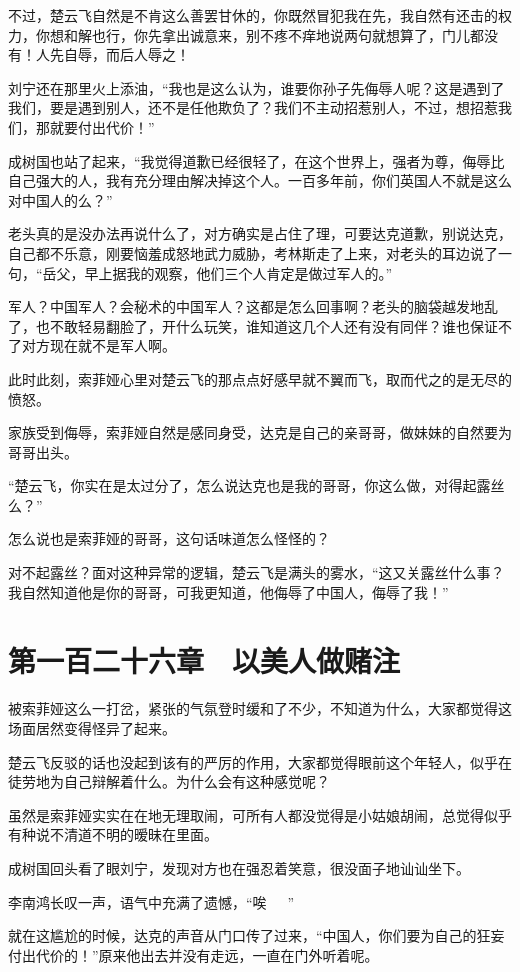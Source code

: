 不过，楚云飞自然是不肯这么善罢甘休的，你既然冒犯我在先，我自然有还击的权力，你想和解也行，你先拿出诚意来，别不疼不痒地说两句就想算了，门儿都没有！人先自辱，而后人辱之！

刘宁还在那里火上添油，“我也是这么认为，谁要你孙子先侮辱人呢？这是遇到了我们，要是遇到别人，还不是任他欺负了？我们不主动招惹别人，不过，想招惹我们，那就要付出代价！”

成树国也站了起来，“我觉得道歉已经很轻了，在这个世界上，强者为尊，侮辱比自己强大的人，我有充分理由解决掉这个人。一百多年前，你们英国人不就是这么对中国人的么？”

老头真的是没办法再说什么了，对方确实是占住了理，可要达克道歉，别说达克，自己都不乐意，刚要恼羞成怒地武力威胁，考林斯走了上来，对老头的耳边说了一句，“岳父，早上据我的观察，他们三个人肯定是做过军人的。”

军人？中国军人？会秘术的中国军人？这都是怎么回事啊？老头的脑袋越发地乱了，也不敢轻易翻脸了，开什么玩笑，谁知道这几个人还有没有同伴？谁也保证不了对方现在就不是军人啊。

此时此刻，索菲娅心里对楚云飞的那点点好感早就不翼而飞，取而代之的是无尽的愤怒。

家族受到侮辱，索菲娅自然是感同身受，达克是自己的亲哥哥，做妹妹的自然要为哥哥出头。

“楚云飞，你实在是太过分了，怎么说达克也是我的哥哥，你这么做，对得起露丝么？”

怎么说也是索菲娅的哥哥，这句话味道怎么怪怪的？

对不起露丝？面对这种异常的逻辑，楚云飞是满头的雾水，“这又关露丝什么事？我自然知道他是你的哥哥，可我更知道，他侮辱了中国人，侮辱了我！”

\section{第一百二十六章　以美人做赌注}

被索菲娅这么一打岔，紧张的气氛登时缓和了不少，不知道为什么，大家都觉得这场面居然变得怪异了起来。

楚云飞反驳的话也没起到该有的严厉的作用，大家都觉得眼前这个年轻人，似乎在徒劳地为自己辩解着什么。为什么会有这种感觉呢？

虽然是索菲娅实实在在地无理取闹，可所有人都没觉得是小姑娘胡闹，总觉得似乎有种说不清道不明的暧昧在里面。

成树国回头看了眼刘宁，发现对方也在强忍着笑意，很没面子地讪讪坐下。

李南鸿长叹一声，语气中充满了遗憾，“唉~~~”

就在这尴尬的时候，达克的声音从门口传了过来，“中国人，你们要为自己的狂妄付出代价的！”原来他出去并没有走远，一直在门外听着呢。

